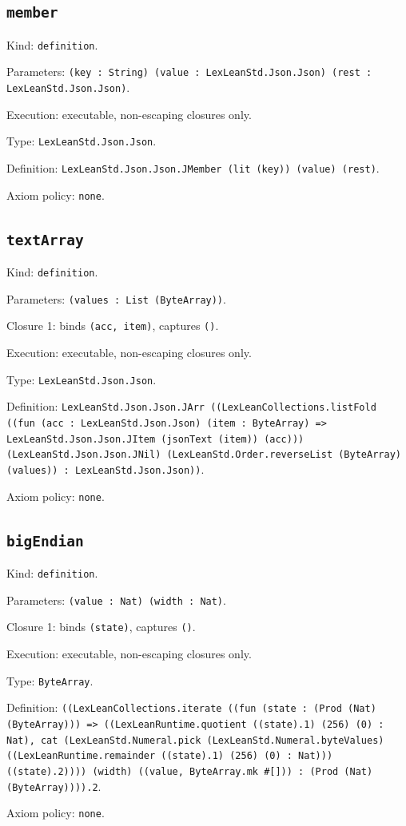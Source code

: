 \documentclass[11pt]{article}
\begin{document}
\subsection*{\texttt{member}}
\noindent Kind: \texttt{definition}.\par
\noindent Parameters: \texttt{(key : String) (value : LexLeanStd.Json.Json) (rest : LexLeanStd.Json.Json)}.\par
\noindent Execution: executable, non-escaping closures only.\par
\noindent Type: \texttt{LexLeanStd.Json.Json}.\par
\noindent Definition: \texttt{LexLeanStd.Json.Json.JMember (lit (key)) (value) (rest)}.\par
\noindent Axiom policy: \texttt{none}.\par
\subsection*{\texttt{textArray}}
\noindent Kind: \texttt{definition}.\par
\noindent Parameters: \texttt{(values : List (ByteArray))}.\par
\noindent Closure 1: binds \texttt{(acc, item)}, captures \texttt{()}.\par
\noindent Execution: executable, non-escaping closures only.\par
\noindent Type: \texttt{LexLeanStd.Json.Json}.\par
\noindent Definition: \texttt{LexLeanStd.Json.Json.JArr ((LexLeanCollections.listFold ((fun (acc : LexLeanStd.Json.Json) (item : ByteArray) => LexLeanStd.Json.Json.JItem (jsonText (item)) (acc))) (LexLeanStd.Json.Json.JNil) (LexLeanStd.Order.reverseList (ByteArray) (values)) : LexLeanStd.Json.Json))}.\par
\noindent Axiom policy: \texttt{none}.\par
\subsection*{\texttt{bigEndian}}
\noindent Kind: \texttt{definition}.\par
\noindent Parameters: \texttt{(value : Nat) (width : Nat)}.\par
\noindent Closure 1: binds \texttt{(state)}, captures \texttt{()}.\par
\noindent Execution: executable, non-escaping closures only.\par
\noindent Type: \texttt{ByteArray}.\par
\noindent Definition: \texttt{((LexLeanCollections.iterate ((fun (state : (Prod (Nat) (ByteArray))) => ((LexLeanRuntime.quotient ((state).1) (256) (0) : Nat), cat (LexLeanStd.Numeral.pick (LexLeanStd.Numeral.byteValues) ((LexLeanRuntime.remainder ((state).1) (256) (0) : Nat))) ((state).2)))) (width) ((value, ByteArray.mk \#[])) : (Prod (Nat) (ByteArray)))).2}.\par
\noindent Axiom policy: \texttt{none}.\par
\end{document}
